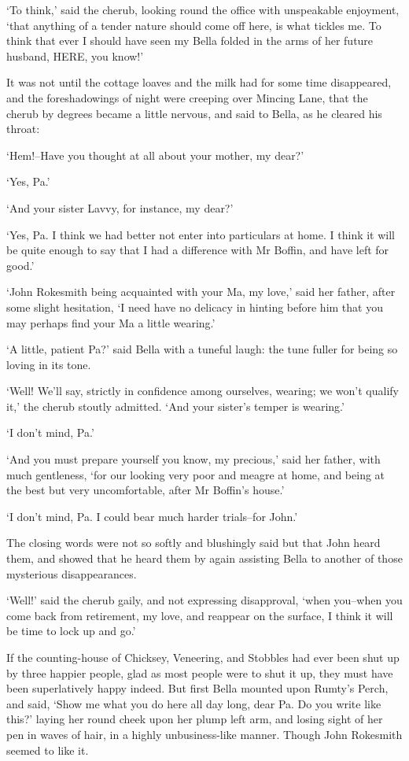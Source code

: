 ‘To think,’ said the cherub, looking round the office with unspeakable
enjoyment, ‘that anything of a tender nature should come off here, is
what tickles me. To think that ever I should have seen my Bella folded
in the arms of her future husband, HERE, you know!’

It was not until the cottage loaves and the milk had for some time
disappeared, and the foreshadowings of night were creeping over Mincing
Lane, that the cherub by degrees became a little nervous, and said to
Bella, as he cleared his throat:

‘Hem!--Have you thought at all about your mother, my dear?’

‘Yes, Pa.’

‘And your sister Lavvy, for instance, my dear?’

‘Yes, Pa. I think we had better not enter into particulars at home. I
think it will be quite enough to say that I had a difference with Mr
Boffin, and have left for good.’

‘John Rokesmith being acquainted with your Ma, my love,’ said her
father, after some slight hesitation, ‘I need have no delicacy in
hinting before him that you may perhaps find your Ma a little wearing.’

‘A little, patient Pa?’ said Bella with a tuneful laugh: the tune fuller
for being so loving in its tone.

‘Well! We’ll say, strictly in confidence among ourselves, wearing;
we won’t qualify it,’ the cherub stoutly admitted. ‘And your sister’s
temper is wearing.’

‘I don’t mind, Pa.’

‘And you must prepare yourself you know, my precious,’ said her father,
with much gentleness, ‘for our looking very poor and meagre at home, and
being at the best but very uncomfortable, after Mr Boffin’s house.’

‘I don’t mind, Pa. I could bear much harder trials--for John.’

The closing words were not so softly and blushingly said but that John
heard them, and showed that he heard them by again assisting Bella to
another of those mysterious disappearances.

‘Well!’ said the cherub gaily, and not expressing disapproval, ‘when
you--when you come back from retirement, my love, and reappear on the
surface, I think it will be time to lock up and go.’

If the counting-house of Chicksey, Veneering, and Stobbles had ever been
shut up by three happier people, glad as most people were to shut it up,
they must have been superlatively happy indeed. But first Bella mounted
upon Rumty’s Perch, and said, ‘Show me what you do here all day long,
dear Pa. Do you write like this?’ laying her round cheek upon her plump
left arm, and losing sight of her pen in waves of hair, in a highly
unbusiness-like manner. Though John Rokesmith seemed to like it.

